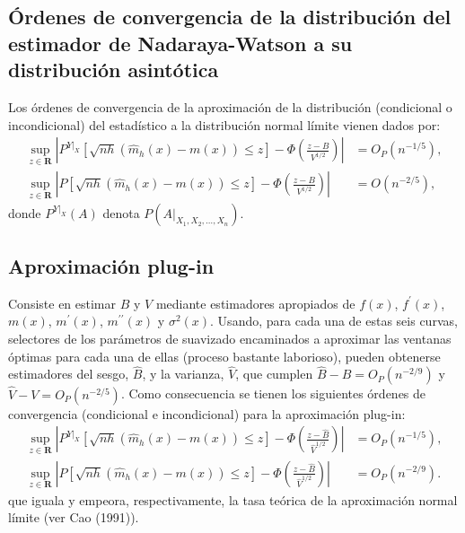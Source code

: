 \documentclass[]{book}
\theoremstyle{definition}
\theoremstyle{definition}
\theoremstyle{definition}
\theoremstyle{remark}
\begin{document}
\subsection{Órdenes de convergencia de la distribución del estimador de
Nadaraya-Watson a su distribución
asintótica}\label{ordenes-de-convergencia-de-la-distribucion-del-estimador-de-nadaraya-watson-a-su-distribucion-asintotica}

Los órdenes de convergencia de la aproximación de la distribución
(condicional o incondicional) del estadístico a la distribución normal
límite vienen dados por: \[\begin{aligned}
\sup_{z\in \boldsymbol{R}}\left\vert P^{\left. Y\right\vert _{X}}\left[ 
\sqrt{nh}\left( \hat{m}_{h}\left( x \right) -m\left( x \right) \right) \leq z
\right] -\Phi \left( \frac{z-B}{V^{1/2}} \right) \right\vert &= O_{P}\left(
n^{-1/5} \right), \\
\sup_{z\in \boldsymbol{R}}\left\vert P\left[ \sqrt{nh}\left( \hat{m}
_{h}\left( x \right) -m\left( x \right) \right) \leq z\right] -\Phi \left( 
\frac{z-B}{V^{1/2}} \right) \right\vert &= O\left( n^{-2/5} \right),
\end{aligned}\] donde \(P^{\left. Y\right\vert_{X}}\left( A \right)\)
denota \(P\left( \left. A \right\vert_{X_1,X_2,\ldots ,X_n} \right)\).

\subsection{Aproximación plug-in}\label{aproximacion-plug-in-1}

Consiste en estimar \(B\) y \(V\) mediante estimadores apropiados de
\(f\left(x \right)\), \(f^{\prime}\left( x \right)\),
\(m\left( x \right)\), \(m^{\prime}\left( x \right)\),
\(m^{\prime \prime }\left( x \right)\) y \(\sigma^2\left( x \right)\).
Usando, para cada una de estas seis curvas, selectores de los parámetros
de suavizado encaminados a aproximar las ventanas óptimas para cada una
de ellas (proceso bastante laborioso), pueden obtenerse estimadores del
sesgo, \(\hat{B}\), y la varianza, \(\hat{V}\), que cumplen
\(\hat{B}-B=O_{P}\left( n^{-2/9} \right)\) y
\(\hat{V}-V=O_{P}\left( n^{-2/5} \right)\). Como consecuencia se tienen
los siguientes órdenes de convergencia (condicional e incondicional)
para la aproximación plug-in: \[\begin{aligned}
\sup_{z\in \boldsymbol{R}}\left\vert P^{\left. Y\right\vert _{X}}\left[ 
\sqrt{nh}\left( \hat{m}_{h}\left( x \right) -m\left( x \right) \right) \leq z
\right] -\Phi \left( \frac{z-\hat{B}}{\hat{V}^{1/2}} \right) \right\vert
&= O_{P}\left( n^{-1/5} \right), \\
\sup_{z\in \boldsymbol{R}}\left\vert P\left[ \sqrt{nh}\left( \hat{m}
_{h}\left( x \right) -m\left( x \right) \right) \leq z\right] -\Phi \left( 
\frac{z-\hat{B}}{\hat{V}^{1/2}} \right) \right\vert &= O_{P}\left(
n^{-2/9} \right).
\end{aligned}\] que iguala y empeora, respectivamente, la tasa teórica
de la aproximación normal límite (ver Cao (1991)).
\end{document}
